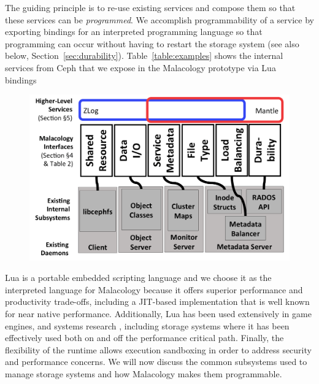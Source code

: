 The guiding principle is to re-use existing services and compose them so that
these services can be \emph{programmed}. We accomplish programmability of a
service by exporting bindings for an interpreted programming
language so that programming can occur without having to restart the storage
system (see also below, Section~\ref{sec:durability}). Table~\ref{table:examples}
shows the internal services from Ceph that we expose in the Malacology
prototype via Lua~\cite{ierusalimschy1996lua} bindings
 

\begin{figure}[tbp]
\centering
\includegraphics{figures/implementation-overview.png}
\caption{
\label{fig:implementation-overview}}
\end{figure}

Lua is a portable embedded scripting language and we choose it as the
interpreted language for Malacology because it offers superior performance and
productivity trade-offs, including a JIT-based implementation that is well
known for near native performance. Additionally, Lua has been used extensively
in game engines, and systems research \cite{neto:dls14-luaos}, including
storage systems where it has been effectively used both on
\cite{grawinkel:pdsw2012-lua,watkins2013:bdmc13-in-vivo,geambasu_comet_2010}
and off \cite{sevilla:sc15-mantle} the performance critical path. Finally, the
flexibility of the runtime allows execution sandboxing in order to address
security and performance concerns. We will now discuss the common subsystems
used to manage storage systems and how Malacology makes them programmable.

